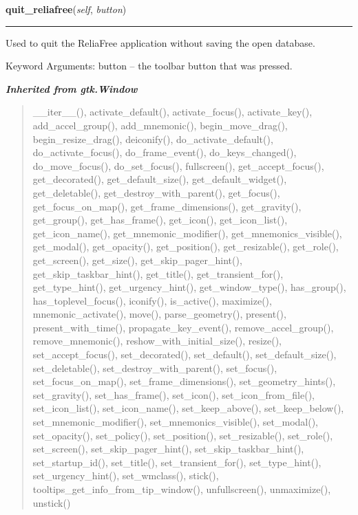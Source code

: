 \hspace{.8\funcindent}\begin{boxedminipage}{\funcwidth}

    \raggedright \textbf{quit\_reliafree}(\textit{self}, \textit{button})

    \vspace{-1.5ex}

    \rule{\textwidth}{0.5\fboxrule}
\setlength{\parskip}{2ex}
    Used to quit the ReliaFree application without saving the open 
    database.

    Keyword Arguments: button -- the toolbar button that was pressed.

\setlength{\parskip}{1ex}
    \end{boxedminipage}


\large{\textbf{\textit{Inherited from gtk.Window}}}

\begin{quote}
\_\_iter\_\_(), activate\_default(), activate\_focus(), activate\_key(), add\_accel\_group(), add\_mnemonic(), begin\_move\_drag(), begin\_resize\_drag(), deiconify(), do\_activate\_default(), do\_activate\_focus(), do\_frame\_event(), do\_keys\_changed(), do\_move\_focus(), do\_set\_focus(), fullscreen(), get\_accept\_focus(), get\_decorated(), get\_default\_size(), get\_default\_widget(), get\_deletable(), get\_destroy\_with\_parent(), get\_focus(), get\_focus\_on\_map(), get\_frame\_dimensions(), get\_gravity(), get\_group(), get\_has\_frame(), get\_icon(), get\_icon\_list(), get\_icon\_name(), get\_mnemonic\_modifier(), get\_mnemonics\_visible(), get\_modal(), get\_opacity(), get\_position(), get\_resizable(), get\_role(), get\_screen(), get\_size(), get\_skip\_pager\_hint(), get\_skip\_taskbar\_hint(), get\_title(), get\_transient\_for(), get\_type\_hint(), get\_urgency\_hint(), get\_window\_type(), has\_group(), has\_toplevel\_focus(), iconify(), is\_active(), maximize(), mnemonic\_activate(), move(), parse\_geometry(), present(), present\_with\_time(), propagate\_key\_event(), remove\_accel\_group(), remove\_mnemonic(), reshow\_with\_initial\_size(), resize(), set\_accept\_focus(), set\_decorated(), set\_default(), set\_default\_size(), set\_deletable(), set\_destroy\_with\_parent(), set\_focus(), set\_focus\_on\_map(), set\_frame\_dimensions(), set\_geometry\_hints(), set\_gravity(), set\_has\_frame(), set\_icon(), set\_icon\_from\_file(), set\_icon\_list(), set\_icon\_name(), set\_keep\_above(), set\_keep\_below(), set\_mnemonic\_modifier(), set\_mnemonics\_visible(), set\_modal(), set\_opacity(), set\_policy(), set\_position(), set\_resizable(), set\_role(), set\_screen(), set\_skip\_pager\_hint(), set\_skip\_taskbar\_hint(), set\_startup\_id(), set\_title(), set\_transient\_for(), set\_type\_hint(), set\_urgency\_hint(), set\_wmclass(), stick(), tooltips\_get\_info\_from\_tip\_window(), unfullscreen(), unmaximize(), unstick()
\end{quote}

